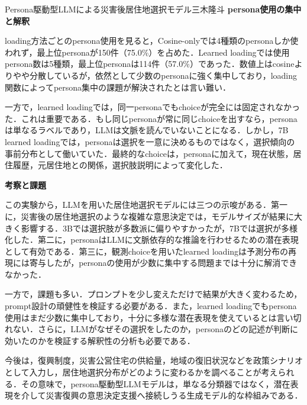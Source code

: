 \begin{column}{Persona駆動型LLMによる災害後居住地選択モデル}{三木隆斗}
\medskip
\noindent
\textbf{persona使用の集中と解釈}

loading方法ごとのpersona使用を見ると，Cosine-onlyでは4種類のpersonaしか使われず，最上位personaが150件（75.0\%）を占めた．Learned loadingでは使用persona数は5種類，最上位personaは114件（57.0\%）であった．数値上はcosineよりやや分散しているが，依然として少数のpersonaに強く集中しており，loading関数によってpersona集中の課題が解決されたとは言い難い．

一方で，learned loadingでは，同一personaでもchoiceが完全には固定されなかった．これは重要である．もし同じpersonaが常に同じchoiceを出すなら，personaは単なるラベルであり，LLMは文脈を読んでいないことになる．しかし，7B learned loadingでは，personaは選択を一意に決めるものではなく，選択傾向の事前分布として働いていた．最終的なchoiceは，personaに加えて，現在状態，居住履歴，元居住地との関係，選択肢説明によって変化した．

\medskip
\noindent
\textbf{考察と課題}

この実験から，LLMを用いた居住地選択モデルには三つの示唆がある．第一に，災害後の居住地選択のような複雑な意思決定では，モデルサイズが結果に大きく影響する．3Bでは選択肢が多数派に偏りやすかったが，7Bでは選択が多様化した．第二に，personaはLLMに文脈依存的な推論を行わせるための潜在表現として有効である．第三に，観測choiceを用いたlearned loadingは予測分布の再現には寄与したが，personaの使用が少数に集中する問題までは十分に解消できなかった．

一方で，課題も多い．プロンプトを少し変えただけで結果が大きく変わるため，prompt設計の頑健性を検証する必要がある．また，learned loadingでもpersona使用はまだ少数に集中しており，十分に多様な潜在表現を使えているとは言い切れない．さらに，LLMがなぜその選択をしたのか，personaのどの記述が判断に効いたのかを検証する解釈性の分析も必要である．

今後は，復興制度，災害公営住宅の供給量，地域の復旧状況などを政策シナリオとして入力し，居住地選択分布がどのように変わるかを調べることが考えられる．その意味で，persona駆動型LLMモデルは，単なる分類器ではなく，潜在表現を介して災害復興の意思決定支援へ接続しうる生成モデル的な枠組みである．
\end{column}
\clearpage
